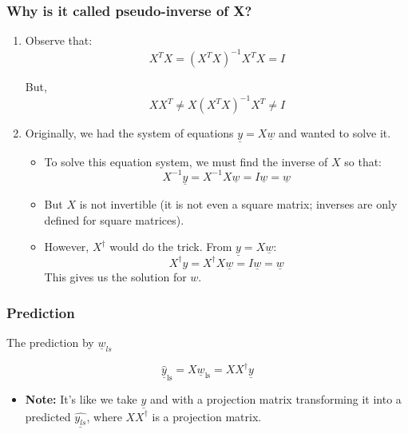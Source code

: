     \subsubsection{Why is it called pseudo-inverse of X?}
    \begin{intuition}
        \begin{enumerate}
            \item Observe that:
            \[
            X^T X = \left( X^T X \right)^{-1} X^T X = I
            \]
            
            But,
            \[
            X X^T \neq X \left( X^T X \right)^{-1} X^T \neq I
            \]
            \item Originally, we had the system of equations \( \underline{y} = X \underline{w} \) and wanted to solve it.

            \begin{itemize}
            
                \item To solve this equation system, we must find the inverse of \( X \) so that:
                \[
                X^{-1} \underline{y} = X^{-1} X \underline{w} = I \underline{w} = \underline{w}
                \]
            
                \item But \( X \) is not invertible (it is not even a square matrix; inverses are only defined for square matrices).
            
                \item However, \( X^{\dagger} \) would do the trick. From \( \underline{y} = X \underline{w} \):
                \[
                X^{\dagger} y = X^{\dagger} X \underline{w} = I\underline{w} = \underline{w}
                \]
                This gives us the solution for \( w \).
            
            \end{itemize}
        \end{enumerate}
    \end{intuition}

    \subsubsection{Prediction}
    \begin{definition}
        The prediction by $\underline{w}_{ls}$

        \begin{equation}
            \hat{\underline{y}}_{\text{ls}} = X \underline{w}_{\text{ls}} = X X^{\dagger} \underline{y}
        \end{equation}
        \begin{itemize}
            \item \textbf{Note:} It's like we take $\underline{y}$ and with a projection matrix transforming it into a predicted $\underline{\hat{y_{ls}}}$, where $XX^{\dagger}$ is a projection matrix.
        \end{itemize}
    \end{definition}


